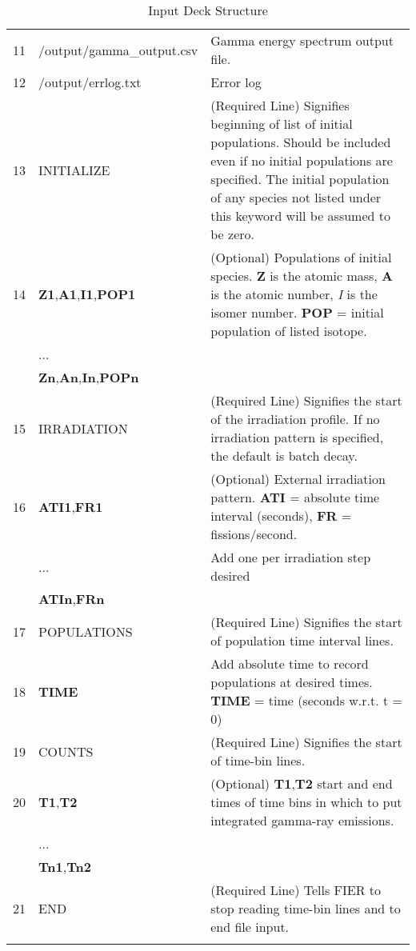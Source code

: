 \documentclass{article}
\begin{document}
\begin{appendices}
\begin{longtable}{p{}p{} p{}}
        11&/output/gamma\_output.csv & Gamma energy spectrum output file. \\
        12&/output/errlog.txt & Error log\\
        13&INITIALIZE&(Required Line) Signifies beginning of list of initial populations. Should be included even if no initial populations are specified. The initial population of any species not listed under this keyword will be assumed to be zero. \\
14&\textbf{Z1},\textbf{A1},\textbf{I1},\textbf{POP1}&(Optional) Populations of initial species. \textbf{Z} is the atomic mass, \textbf{A} is the atomic number, \textit{I} is the isomer number. \textbf{POP} = initial population of listed isotope.\\
&...	& \\
&\textbf{Zn},\textbf{An},\textbf{In},\textbf{POPn}&\\
15&IRRADIATION&(Required Line) Signifies the start of the irradiation profile. If no irradiation pattern is specified, the default is batch decay.\\
16&\textbf{ATI1},\textbf{FR1}&(Optional) External irradiation pattern. \textbf{ATI} = absolute time interval (seconds), \textbf{FR} = fissions/second.\\
&...&Add one per irradiation step desired\\
&\textbf{ATIn},\textbf{FRn}&\\
17&POPULATIONS&(Required Line) Signifies the start of population time interval lines.\\
18&\textbf{TIME}&Add absolute time to record populations at desired times. \textbf{TIME} = time (seconds w.r.t. t = 0)\\
19&COUNTS &(Required Line) Signifies the start of time-bin lines. \\
20&\textbf{T1},\textbf{T2}&(Optional) \textbf{T1},\textbf{T2} start and end times of time bins in which to put integrated gamma-ray emissions.\\
&...& \\	
&\textbf{Tn1},\textbf{Tn2}&\\
21&END&(Required Line) Tells FIER to stop reading time-bin lines and to end file input.\\
       \hline 
     \caption{Input Deck Structure}  
     \label{tab:my_label}
    \end{longtable}


\end{appendices}
\end{document}
